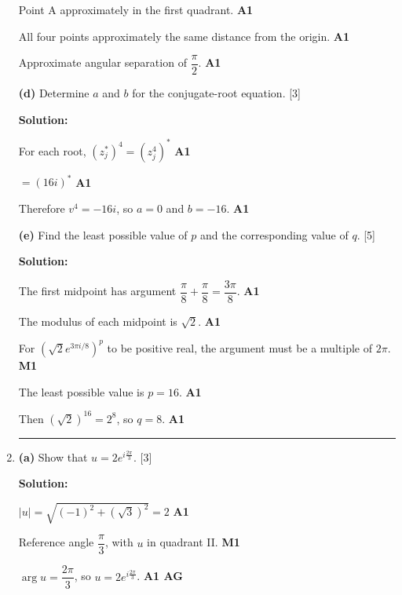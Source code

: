 \documentclass[12pt, twoside]{article}
\begin{document}
\begin{enumerate}[itemsep=0.3cm]
Point A approximately in the first quadrant. \hfill \textbf{A1}

All four points approximately the same distance from the origin. \hfill \textbf{A1}

Approximate angular separation of $\dfrac{\pi}{2}$. \hfill \textbf{A1}

\medskip

\textbf{(d)} Determine $a$ and $b$ for the conjugate-root equation. \hfill [3]

\textbf{Solution:}

For each root, $(z_j^{*})^4 = (z_j^4)^{*}$ \hfill \textbf{A1}

$= (16i)^{*}$ \hfill \textbf{A1}

Therefore $v^4 = -16i$, so $a = 0$ and $b = -16$. \hfill \textbf{A1}

\medskip

\textbf{(e)} Find the least possible value of $p$ and the corresponding value of $q$. \hfill [5]

\textbf{Solution:}

The first midpoint has argument
$\dfrac{\pi}{8} + \dfrac{\pi}{8} = \dfrac{3\pi}{8}$. \hfill \textbf{A1}

The modulus of each midpoint is $\sqrt{2}$. \hfill \textbf{A1}

For $(\sqrt{2}e^{3\pi i/8})^p$ to be positive real, the argument must be
a multiple of $2\pi$. \hfill \textbf{M1}

The least possible value is $p = 16$. \hfill \textbf{A1}

Then $(\sqrt{2})^{16} = 2^8$, so $q = 8$. \hfill \textbf{A1}

\bigskip
\hrule
\bigskip

\item[5.] 

\textbf{(a)} Show that $u = 2e^{i\frac{2\pi}{3}}$. \hfill [3]

\textbf{Solution:}

$|u| = \sqrt{(-1)^2 + (\sqrt{3})^2} = 2$ \hfill \textbf{A1}

Reference angle $\dfrac{\pi}{3}$, with $u$ in quadrant II. \hfill \textbf{M1}

$\arg u = \dfrac{2\pi}{3}$, so $u = 2e^{i\frac{2\pi}{3}}$. \hfill \textbf{A1 AG}

\medskip


\end{enumerate}
\end{document}
